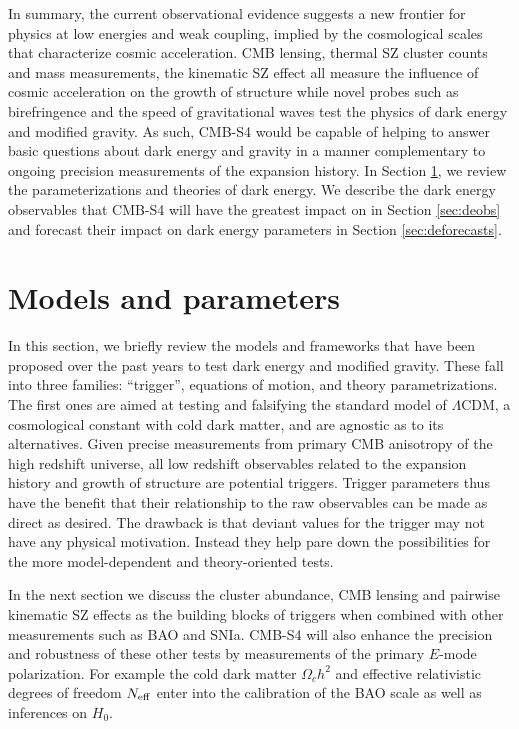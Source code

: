 In summary, the current observational evidence suggests a new frontier for physics at low energies and weak coupling, implied by the cosmological scales that characterize cosmic acceleration.  CMB lensing, thermal SZ cluster counts and mass measurements,  the kinematic SZ effect  all measure the influence of cosmic acceleration on the growth of 
structure while novel probes such as birefringence and the speed of gravitational waves test the physics of dark energy and modified gravity.   As such, CMB-S4 would be capable of helping to answer basic questions about dark energy and gravity in a manner complementary to ongoing precision measurements of the expansion history.    In Section \ref{sec:deparam}, we review the parameterizations and theories of dark energy.  We describe the 
dark energy observables that CMB-S4 will have the greatest impact on in Section \ref{sec:deobs} and forecast their impact on dark energy 
parameters in Section \ref{sec:deforecasts}.

\section{Models and parameters}
\label{sec:deparam}

In this section, we  briefly review the models and frameworks that have been proposed over the past years to test dark energy and modified gravity.   These fall into 
three families: ``trigger'', equations of motion, and theory parametrizations. The first ones are aimed at testing and falsifying the standard model
of $\Lambda$CDM, a cosmological constant with cold dark matter, and are agnostic as to its 
alternatives.  Given precise measurements from primary CMB anisotropy of the high redshift universe, all low redshift observables related to the expansion history and growth of
structure are potential triggers.  Trigger parameters thus have the benefit that their relationship to the raw observables can be made as direct as desired.   The drawback is 
that deviant values for the trigger may not have any physical motivation.  Instead they help pare down the possibilities for the more model-dependent and theory-oriented tests.  


  In the next section we discuss the cluster abundance,
 CMB lensing and pairwise kinematic SZ effects as the building blocks of triggers when
 combined with other measurements such as BAO and SNIa.   CMB-S4 will also enhance the precision and robustness
 of these other tests by measurements of the primary $E$-mode polarization.   For example
 the cold dark matter $\Omega_c h^2$ and effective relativistic degrees of freedom $N_{\rm eff}$ enter into the calibration of the BAO scale as well as inferences on $H_0$. 
 
